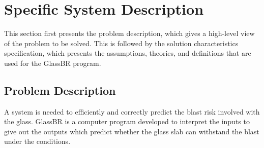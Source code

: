 \documentclass[12pt]{article}
\begin{document}
\section{Specific System Description}
\label{Sec:SpecSystDesc}
This section first presents the problem description, which gives a high-level view of the problem to be solved. This is followed by the solution characteristics specification, which presents the assumptions, theories, and definitions that are used for the GlassBR program.
\subsection{Problem Description}
\label{Sec:ProbDesc}
A system is needed to efficiently and correctly predict the blast risk involved with the glass. GlassBR is a computer program developed to interpret the inputs to give out the outputs which predict whether the glass slab can withstand the blast under the conditions.
\end{document}
